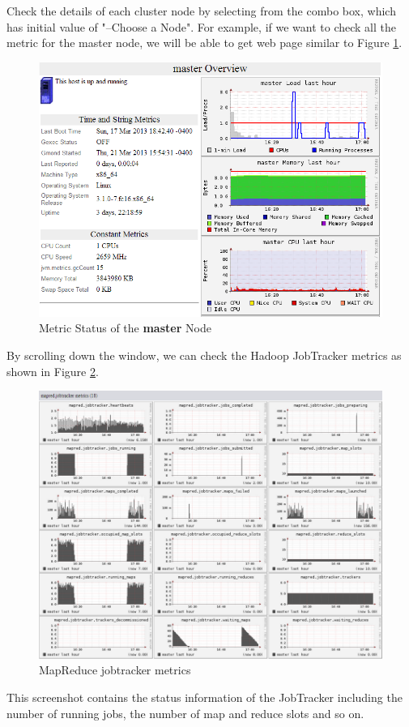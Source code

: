 Check the details of each cluster node by selecting from the combo box, which has initial value of "--Choose a Node". For example, if we want to check all the metric for the master node, we will be able to get web page similar to Figure \ref{fig:master.status}.
\begin{figure}[ht]
  \centering
  \includegraphics[width=.8\textwidth]{figs/5163os_06_11.png}
  \caption{Metric Status of the \textbf{master} Node}\label{fig:master.status}
\end{figure} 
By scrolling down the window, we can check the Hadoop JobTracker metrics as shown in Figure \ref{fig:jobtracker.metrics}.
\begin{figure}[ht]
  \centering
  \includegraphics[width=.8\textwidth]{figs/5163os_06_12.png}
  \caption{MapReduce jobtracker metrics}\label{fig:jobtracker.metrics}
\end{figure} 
This screenshot contains the status information of the JobTracker including the number of running jobs, the number of map and reduce slots and so on.

